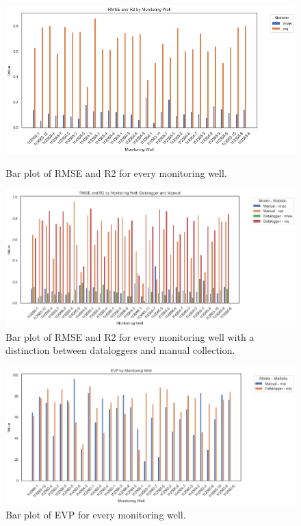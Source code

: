 \begin{figure}[h]
    \centering
    \begin{minipage}{0.48\textwidth}
        \centering
        \includegraphics[width=\linewidth]{rmser2roz.png} %
        \caption{Bar plot of RMSE and R2 for every monitoring well.}
        \label{fig:first-figure}
    \end{minipage}\hfill
    \begin{minipage}{0.48\textwidth}
        \centering
        \includegraphics[width=\linewidth]{rmser2roz2.png} %
        \caption{Bar plot of RMSE and R2 for every monitoring well with a distinction between dataloggers and manual collection.}
        \label{fig:second-figure}
    \end{minipage}
\end{figure}

\begin{figure}[h]
    \centering
    \begin{minipage}{0.48\textwidth}
        \centering
        \includegraphics[width=\linewidth]{evproz2.png} %
        \caption{Bar plot of EVP for every monitoring well.}
        \label{fig:evproz}
    \end{minipage}\hfill
\end{figure}


